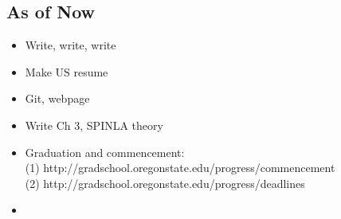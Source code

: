 \documentclass{article}
\begin{document}
\subsection*{As of Now}
\begin{itemize}
\item Write, write, write
\item Make US resume
\item Git, webpage
\item Write Ch 3, SPINLA theory
\item Graduation and commencement: \\
(1) http://gradschool.oregonstate.edu/progress/commencement \\ 
(2) http://gradschool.oregonstate.edu/progress/deadlines \\
\item 
\end{itemize}

% 

\end{document}
